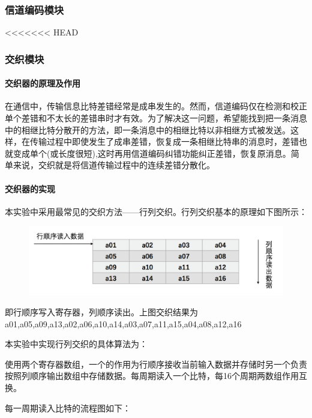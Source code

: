 \documentclass[UTF8]{ctexart}
\begin{document}
\subsubsection{信道编码模块}


<<<<<<< HEAD
\subsubsection{交织模块}

\paragraph{交织器的原理及作用}

在通信中，传输信息比特差错经常是成串发生的。然而，信道编码仅在检测和校正单个差错和不太长的差错串时才有效。为了解决这一问题，希望能找到把一条消息中的相继比特分散开的方法，即一条消息中的相继比特以非相继方式被发送。这样，在传输过程中即使发生了成串差错，恢复成一条相继比特串的消息时，差错也就变成单个(或长度很短),这时再用信道编码纠错功能纠正差错，恢复原消息。简单来说，交织就是将信道传输过程中的连续差错分散化。

\paragraph{交织器的实现}

本实验中采用最常见的交织方法——行列交织。行列交织基本的原理如下图所示：

\begin{figure}[H]
    \centering
    \includegraphics[width=\textwidth]{images//inter_input.png}
\end{figure}

即行顺序写入寄存器，列顺序读出。上图交织结果为a01,a05,a09,a13,a02,a06,a10,a14,a03,a07,a11,a15,a04,a08,a12,a16


本实验中实现行列交织的具体算法为：

使用两个寄存器数组，一个的作用为行顺序接收当前输入数据并存储时另一个负责按照列顺序输出数组中存储数据。每周期读入一个比特，每16个周期两数组作用互换。

每一周期读入比特的流程图如下：
\end{document}
